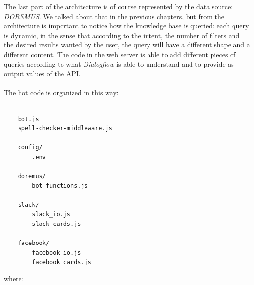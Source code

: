 \documentclass[a4paper,12pt]{report}
\begin{document}
	The last part of the architecture is of course represented by the data source: \textit{DOREMUS}. We talked about that in the previous chapters, but from the architecture is important to notice how the knowledge base is queried: each query is dynamic, in the sense that according to the intent, the number of filters and the desired results wanted by the user, the query will have a different shape and a different content. The code in the web server is able to add different pieces of queries according to what \textit{Dialogflow} is able to understand and to provide as output values of the API.\\\\
	The bot code is organized in this way:
	\begin{lstlisting}
	
	bot.js
	spell-checker-middleware.js
	
	config/
		.env
	
	doremus/
		bot_functions.js
	
	slack/
		slack_io.js
		slack_cards.js
	
	facebook/
		facebook_io.js
		facebook_cards.js
	\end{lstlisting}
	where:
\end{document}
